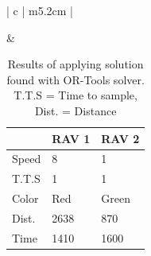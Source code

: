 \begin{table}[H]
\begin{tabular}{ | c | m{5.2cm} | }
\begin{minipage}[c][53mm][c]{.6\textwidth}
    \end{minipage}
    &
    \small
    \begin{tabular}{m{10mm}|m{11mm} m{11mm}}
        & RAV 1 & RAV 2\\
        \hline
        Speed& 8 & 1 \\
        T.T.S & 1 & 1 \\
        Color & Red & Green \\
        \hline
        Dist.& 2638 & 870 \\
        Time& 1410 & 1600 \\
    \end{tabular}
    \normalsize
    \\
    \hline

  \end{tabular}
  \caption{Results of applying solution found with OR-Tools solver. T.T.S = Time to sample, Dist. = Distance}\label{table:ORToolsResults}
\end{table}
